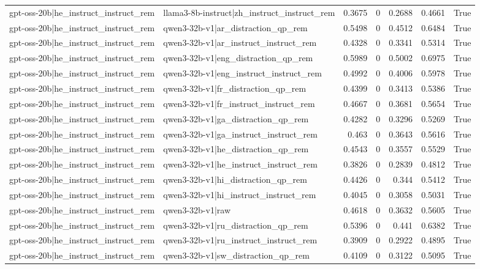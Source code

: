 \begin{table}
\begin{tabular}{l l r r r r l}
gpt-oss-20b|he_instruct_instruct_rem & llama3-8b-instruct|zh_instruct_instruct_rem & 0.3675 & 0 & 0.2688 & 0.4661 & True \\
gpt-oss-20b|he_instruct_instruct_rem & qwen3-32b-v1|ar_distraction_qp_rem & 0.5498 & 0 & 0.4512 & 0.6484 & True \\
gpt-oss-20b|he_instruct_instruct_rem & qwen3-32b-v1|ar_instruct_instruct_rem & 0.4328 & 0 & 0.3341 & 0.5314 & True \\
gpt-oss-20b|he_instruct_instruct_rem & qwen3-32b-v1|eng_distraction_qp_rem & 0.5989 & 0 & 0.5002 & 0.6975 & True \\
gpt-oss-20b|he_instruct_instruct_rem & qwen3-32b-v1|eng_instruct_instruct_rem & 0.4992 & 0 & 0.4006 & 0.5978 & True \\
gpt-oss-20b|he_instruct_instruct_rem & qwen3-32b-v1|fr_distraction_qp_rem & 0.4399 & 0 & 0.3413 & 0.5386 & True \\
gpt-oss-20b|he_instruct_instruct_rem & qwen3-32b-v1|fr_instruct_instruct_rem & 0.4667 & 0 & 0.3681 & 0.5654 & True \\
gpt-oss-20b|he_instruct_instruct_rem & qwen3-32b-v1|ga_distraction_qp_rem & 0.4282 & 0 & 0.3296 & 0.5269 & True \\
gpt-oss-20b|he_instruct_instruct_rem & qwen3-32b-v1|ga_instruct_instruct_rem & 0.463 & 0 & 0.3643 & 0.5616 & True \\
gpt-oss-20b|he_instruct_instruct_rem & qwen3-32b-v1|he_distraction_qp_rem & 0.4543 & 0 & 0.3557 & 0.5529 & True \\
gpt-oss-20b|he_instruct_instruct_rem & qwen3-32b-v1|he_instruct_instruct_rem & 0.3826 & 0 & 0.2839 & 0.4812 & True \\
gpt-oss-20b|he_instruct_instruct_rem & qwen3-32b-v1|hi_distraction_qp_rem & 0.4426 & 0 & 0.344 & 0.5412 & True \\
gpt-oss-20b|he_instruct_instruct_rem & qwen3-32b-v1|hi_instruct_instruct_rem & 0.4045 & 0 & 0.3058 & 0.5031 & True \\
gpt-oss-20b|he_instruct_instruct_rem & qwen3-32b-v1|raw & 0.4618 & 0 & 0.3632 & 0.5605 & True \\
gpt-oss-20b|he_instruct_instruct_rem & qwen3-32b-v1|ru_distraction_qp_rem & 0.5396 & 0 & 0.441 & 0.6382 & True \\
gpt-oss-20b|he_instruct_instruct_rem & qwen3-32b-v1|ru_instruct_instruct_rem & 0.3909 & 0 & 0.2922 & 0.4895 & True \\
gpt-oss-20b|he_instruct_instruct_rem & qwen3-32b-v1|sw_distraction_qp_rem & 0.4109 & 0 & 0.3122 & 0.5095 & True \\

\end{tabular}
\end{table}
